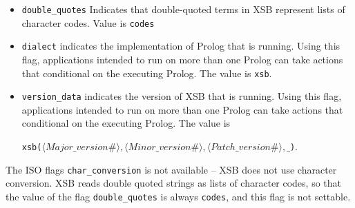 \begin{description}
\begin{itemize}
  {\bf Example}

Suppose the following code has been compiled during an XSB session.

\begin{verbatim}
:- import misc_error/1 from error_handler.

my_unknown_predicate_hook(Goal):-
        writeln(this_is_my_undefined_warning_about(Goal)),
        misc_error(unknown_predicate).
\end{verbatim}

and the following fact asserted into usermod.

\begin{verbatim}
unknown_predicate_hook(my_unknown_predicate_hook(_X)
\end{verbatim}

Then XSB will have the following behavior when calling the following
unknown predicate:

\begin{verbatim}
| ?- foo(X).
this_is_my_undefined_warning_about(foo(A))
++Error[XSB/Runtime/P]: [Miscellaneous] unknown_predicate
Forward Continuation...
:
\end{verbatim}

%
\item {\tt double\_quotes} Indicates that double-quoted terms in XSB
  represent lists of character codes.  Value is {\tt codes}
%
\item {\tt dialect} indicates the implementation of Prolog that is
  running.  Using this flag, applications intended to run on more than
  one Prolog can take actions that conditional on the executing
  Prolog.  The value is {\tt xsb}.

\item {\tt version\_data} indicates the version of XSB that is
  running.  Using this flag, applications intended to run on more than
  one Prolog can take actions that conditional on the executing
  Prolog.  The value is 

{\tt xsb($\langle Major\_version\#\rangle,\langle Minor\_version\#\rangle,\langle Patch\_version\#\rangle,\_$)}.
\end{itemize}

\compatibility The ISO flags {\tt char\_conversion} is not available
-- XSB does not use character conversion.  XSB reads double quoted
strings as lists of character codes, so that the value of the flag
{\tt double\_quotes} is always {\tt codes}, and this flag is not
settable.


\end{description}
